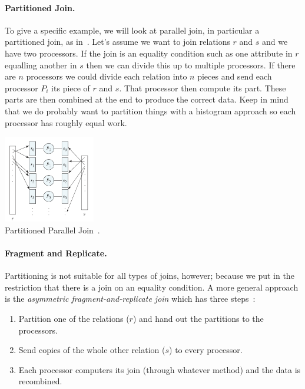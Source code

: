 \paragraph{Partitioned Join. }To give a specific example, we will look at parallel join, in particular a partitioned join, as in~\cite{dsc}. Let's assume we want to join relations $r$ and $s$ and we have two processors. If the join is an equality condition such as one attribute in $r$ equalling another in $s$ then we can divide this up to multiple processors. If there are $n$ processors we could divide each relation into $n$ pieces and send each processor $P_{i}$ its piece of $r$ and $s$. That processor then compute its part. These parts are then combined at the end to produce the correct data. Keep in mind that we do probably want to partition things with a histogram approach so each processor has roughly equal work.

\begin{center}
\includegraphics[width=0.3\textwidth]{images/partitioned-parallel-join}\\
Partitioned Parallel Join~\cite{dsc}.
\end{center}

\paragraph{Fragment and Replicate.} Partitioning is not suitable for all types of joins, however; because we put in the restriction that there is a join on an equality condition. A more general approach is the \textit{asymmetric fragment-and-replicate join} which has three steps~\cite{dsc}:

\begin{enumerate}
\item Partition one of the relations ($r$) and hand out the partitions to the processors.
\item Send copies of the whole other relation ($s$) to every processor.
\item Each processor computers its join (through whatever method) and the data is recombined. 
\end{enumerate}

